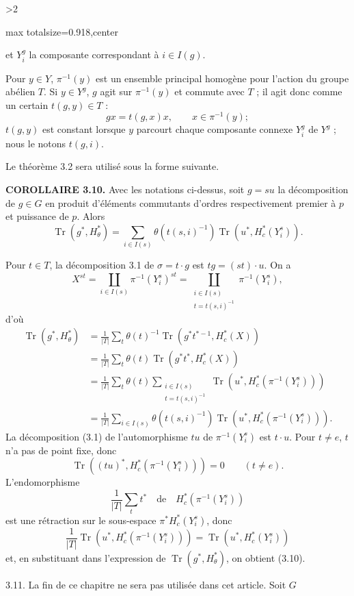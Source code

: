 \documentclass[9pt,twoside]{extarticle}
\newcommand{\EditionPage}[3]{%
  \ifnum#1>2\clearpage\fi
  \pdfbookmark[1]{Printed page #2}{fr-folio-#2}%
  \hypertarget{fr-physical-#1}{}%
  \noindent\begin{adjustbox}{max totalsize={\textwidth}{0.918\textheight},center}
  \begin{minipage}[t]{\textwidth}
  \fontsize{9.4}{11.1}\selectfont\justifying
  #3
  \end{minipage}
  \end{adjustbox}%
}
\begin{document}
\EditionPage{21}{122}{%
et \(Y_i^g\) la composante correspondant à \(i\in I(g)\).\par

Pour \(y\in Y\), \(\pi^{-1}(y)\) est un ensemble principal homogène pour l'action du groupe abélien \(T\). Si \(y\in Y^g\), \(g\) agit sur \(\pi^{-1}(y)\) et commute avec \(T\) ; il agit donc comme un certain \(t(g,y)\in T\) : \[
gx=t(g,x)x,\qquad x\in\pi^{-1}(y);
\]  \(t(g,y)\) est constant lorsque \(y\) parcourt chaque composante connexe \(Y_i^g\) de \(Y^g\) ; nous le notons \(t(g,i)\).\par

Le théorème 3.2 sera utilisé sous la forme suivante.\par

\noindent\textbf{COROLLAIRE 3.10.} Avec les notations ci-dessus, soit \(g=su\) la décomposition de \(g\in G\) en produit d'éléments commutants d'ordres respectivement premier à \(p\) et puissance de \(p\). Alors \[
\operatorname{Tr}(g^*,H_\theta^*)
=
\sum_{i\in I(s)}\theta(t(s,i)^{-1})\operatorname{Tr}(u^*,H_c^*(Y_i^s)).
\]\par

Pour \(t\in T\), la décomposition 3.1 de \(\sigma=t\cdot g\) est \(tg=(st)\cdot u\). On a \[
X^{st}
=
\coprod_{i\in I(s)}\pi^{-1}(Y_i^s)^{st}
=
\coprod_{\substack{i\in I(s)\\t=t(s,i)^{-1}}}\pi^{-1}(Y_i^s),
\] d'où \[
\begin{aligned}
\operatorname{Tr}(g^*,H_\theta^*)
&=\frac1{|T|}\sum_t\theta(t)^{-1}\operatorname{Tr}(g^*t^{*-1},H_c^*(X))\\
&=\frac1{|T|}\sum_t\theta(t)\operatorname{Tr}(g^*t^*,H_c^*(X))\\
&=\frac1{|T|}\sum_t\theta(t)\sum_{\substack{i\in I(s)\\t=t(s,i)^{-1}}}
\operatorname{Tr}(u^*,H_c^*(\pi^{-1}(Y_i^s)))\\
&=\frac1{|T|}\sum_{i\in I(s)}\theta(t(s,i)^{-1})
\operatorname{Tr}(u^*,H_c^*(\pi^{-1}(Y_i^s))).
\end{aligned}
\] La décomposition (3.1) de l'automorphisme \(tu\) de \(\pi^{-1}(Y_i^s)\) est \(t\cdot u\). Pour \(t\ne e\), \(t\) n'a pas de point fixe, donc \[
\operatorname{Tr}((tu)^*,H_c^*(\pi^{-1}(Y_i^s)))=0
\qquad(t\ne e).
\] L'endomorphisme \[
\frac1{|T|}\sum_t t^*\quad\text{de}\quad H_c^*(\pi^{-1}(Y_i^s))
\] est une rétraction sur le sous-espace \(\pi^*H_c^*(Y_i^s)\), donc \[
\frac1{|T|}\operatorname{Tr}(u^*,H_c^*(\pi^{-1}(Y_i^s)))
=
\operatorname{Tr}(u^*,H_c^*(Y_i^s))
\] et, en substituant dans l'expression de \(\operatorname{Tr}(g^*,H_\theta^*)\), on obtient (3.10).\par

3.11. La fin de ce chapitre ne sera pas utilisée dans cet article. Soit \(G\)\par
}
\end{document}
